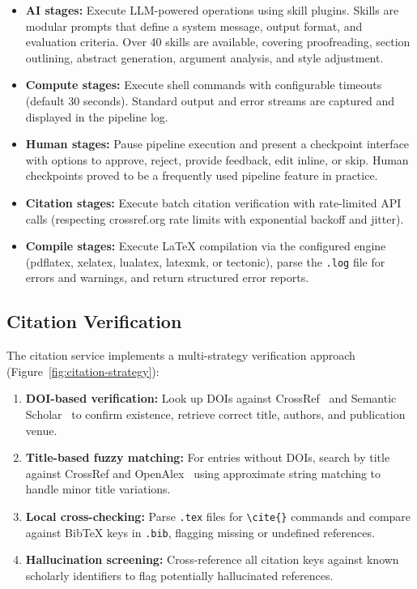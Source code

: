\begin{itemize}
  \item \textbf{AI stages:} Execute LLM-powered operations using skill plugins.
  Skills are modular prompts that define a system message, output format, and
  evaluation criteria. Over 40 skills are available, covering proofreading,
  section outlining, abstract generation, argument analysis, and style
  adjustment.
  \item \textbf{Compute stages:} Execute shell commands with configurable
  timeouts (default 30 seconds). Standard output and error streams are captured
  and displayed in the pipeline log.
  \item \textbf{Human stages:} Pause pipeline execution and present a
  checkpoint interface with options to approve, reject, provide feedback,
  edit inline, or skip. Human checkpoints proved to be a frequently used pipeline
  feature in practice.
  \item \textbf{Citation stages:} Execute batch citation verification with
  rate-limited API calls (respecting crossref.org rate limits with exponential
  backoff and jitter).
  \item \textbf{Compile stages:} Execute \LaTeX{} compilation via the
  configured engine (pdflatex, xelatex, lualatex, latexmk, or tectonic), parse
  the \texttt{.log} file for errors and warnings, and return structured error
  reports.
\end{itemize}

\subsection{Citation Verification}

The citation service implements a multi-strategy verification approach
(Figure~\ref{fig:citation-strategy}):

\begin{enumerate}
  \item \textbf{DOI-based verification:} Look up DOIs against
  CrossRef~\cite{crossrefapi} and Semantic Scholar~\cite{semanticscholarapi}
  to confirm existence, retrieve correct title, authors, and publication venue.
  \item \textbf{Title-based fuzzy matching:} For entries without DOIs, search
  by title against CrossRef and OpenAlex~\cite{openalex} using approximate
  string matching to handle minor title variations.
  \item \textbf{Local cross-checking:} Parse \texttt{.tex} files for
  \texttt{\textbackslash cite\{\}} commands and compare against BibTeX keys in
  \texttt{.bib}, flagging missing or undefined references.
  \item \textbf{Hallucination screening:} Cross-reference all citation keys
  against known scholarly identifiers to flag potentially hallucinated
  references.
\end{enumerate}

